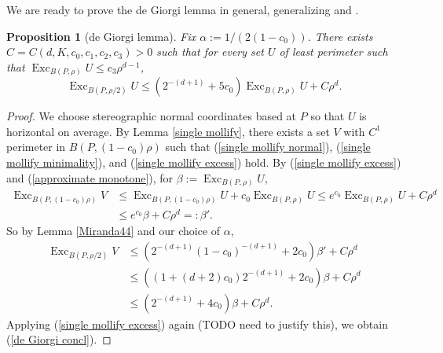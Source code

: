 \documentclass[reqno,10pt]{amsart}
\DeclareMathOperator{\Exc}{Exc}
\newtheorem{proposition}[theorem]{Proposition}
\theoremstyle{definition}
\numberwithin{equation}{section}
\begin{document}
We are ready to prove the de Giorgi lemma in general, generalizing \cite{deGiorgi61} and \cite[Teorema 5.7]{Miranda66}.

\begin{proposition}[de Giorgi lemma]\label{de Giorgi}
Fix $\alpha := 1/(2(1 - c_0))$. There exists $C = C(d, K, c_0, c_1, c_2, c_3) > 0$ such that for every set $U$ of least perimeter such that $\Exc_{B(P, \rho)} U \leq c_3 \rho^{d - 1}$,
\begin{equation}\label{de Giorgi concl}
\Exc_{B(P, \rho/2)} U \leq (2^{-(d + 1)} + 5c_0) \Exc_{B(P, \rho)} U + C\rho^d.
\end{equation}
\end{proposition}
\begin{proof}
We choose stereographic normal coordinates based at $P$ so that $U$ is horizontal on average.
By Lemma \ref{single mollify}, there exists a set $V$ with $C^1$ perimeter in $B(P, (1 - c_0)\rho)$ such that (\ref{single mollify normal}), (\ref{single mollify minimality}), and (\ref{single mollify excess}) hold.
By (\ref{single mollify excess}) and (\ref{approximate monotone}), for $\beta := \Exc_{B(P, \rho)} U$,
\begin{align*}
\Exc_{B(P, (1 - c_0) \rho)} V &\leq \Exc_{B(P, (1 - c_0) \rho)} U + c_0 \Exc_{B(P, \rho)} U \leq e^{c_0} \Exc_{B(P, \rho)} U + C\rho^d \\
&\leq e^{c_0} \beta + C\rho^d =: \beta'.
\end{align*}
So by Lemma \ref{Miranda44} and our choice of $\alpha$,
\begin{align*}
\Exc_{B(P, \rho/2)} V &\leq (2^{-(d + 1)} (1 - c_0)^{-(d + 1)} + 2c_0) \beta' + C\rho^d \\
&\leq ((1 + (d + 2) c_0) 2^{-(d + 1)} + 2c_0) \beta + C\rho^d \\
&\leq (2^{-(d + 1)} + 4c_0) \beta + C\rho^d.
\end{align*}
Applying (\ref{single mollify excess}) again (TODO need to justify this), we obtain (\ref{de Giorgi concl}).
\end{proof}
\end{document}
